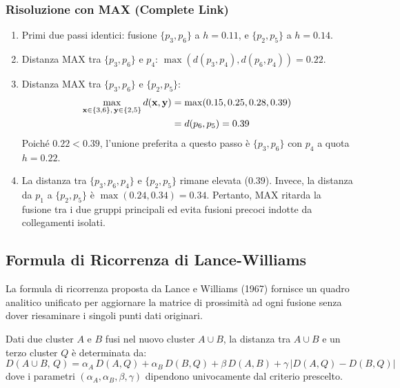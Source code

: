 \subsubsection{Risoluzione con MAX (Complete Link)}
\begin{enumerate}
    \item Primi due passi identici: fusione $\{p_3, p_6\}$ a $h = 0.11$, e $\{p_2, p_5\}$ a $h = 0.14$.
    \item Distanza MAX tra $\{p_3, p_6\}$ e $p_4$: $\max(d(p_3, p_4), d(p_6, p_4)) = 0.22$.
    \item Distanza MAX tra $\{p_3, p_6\}$ e $\{p_2, p_5\}$:
    \begin{align}
        \max_{\mathbf{x} \in \{3,6\}, \, \mathbf{y} \in \{2,5\}} d(\mathbf{x}, \mathbf{y}) &= \max(0.15, 0.25, 0.28, 0.39) \notag \\
        &= d(p_6, p_5) = 0.39
    \end{align}
    Poiché $0.22 < 0.39$, l'unione preferita a questo passo è $\{p_3, p_6\}$ con $p_4$ a quota $h = 0.22$.
    \item La distanza tra $\{p_3, p_6, p_4\}$ e $\{p_2, p_5\}$ rimane elevata ($0.39$). Invece, la distanza da $p_1$ a $\{p_2, p_5\}$ è $\max(0.24, 0.34) = 0.34$. Pertanto, MAX ritarda la fusione tra i due gruppi principali ed evita fusioni precoci indotte da collegamenti isolati.
\end{enumerate}

\FloatBarrier
\subsection{Formula di Ricorrenza di Lance-Williams}

La formula di ricorrenza proposta da Lance e Williams (1967) fornisce un quadro analitico unificato per aggiornare la matrice di prossimità ad ogni fusione senza dover riesaminare i singoli punti dati originari.

\begin{theorem}
Dati due cluster $A$ e $B$ fusi nel nuovo cluster $A \cup B$, la distanza tra $A \cup B$ e un terzo cluster $Q$ è determinata da:
\begin{equation}
    D(A \cup B, \, Q) = \alpha_A \, D(A, Q) + \alpha_B \, D(B, Q) + \beta \, D(A, B) + \gamma \, |D(A, Q) - D(B, Q)|
    \label{eq:dm-lance-williams-general}
\end{equation}
dove i parametri $(\alpha_A, \alpha_B, \beta, \gamma)$ dipendono univocamente dal criterio prescelto.
\end{theorem}

